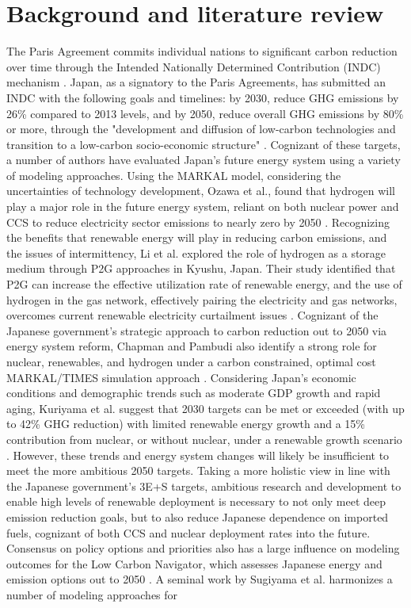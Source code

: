\section{Background and literature review} \label{litreview}
The Paris Agreement commits individual nations to significant carbon reduction over time through the Intended Nationally Determined Contribution (INDC) mechanism \cite{united_nations_framework_convention_on_climate_change_unfccc_submission_2015}. Japan, as a signatory to the Paris Agreements, has submitted an INDC with the following goals and timelines: by 2030, reduce GHG emissions by 26\% compared to 2013 levels, and by 2050, reduce overall GHG emissions by 80\% or more, through the "development and diffusion of low-carbon technologies and transition to a low-carbon socio-economic structure" \cite{united_nations_framework_convention_on_climate_change_unfccc_submission_2015}. Cognizant of these targets, a number of authors have evaluated Japan's future energy system using a variety of modeling approaches. Using the \gls{MARKAL} model, considering the uncertainties of technology development, Ozawa et al., found that hydrogen will play a major role in the future energy system, reliant on both nuclear power and \gls{CCS} to reduce electricity sector emissions to nearly zero by 2050 \cite{ozawa_hydrogen_2018}. Recognizing the benefits that renewable energy will play in reducing carbon emissions, and the issues of intermittency, Li et al. explored the role of hydrogen as a storage medium through \gls{P2G} approaches in Kyushu, Japan. Their study identified that \gls{P2G} can increase the effective utilization rate of renewable energy, and the use of hydrogen in the gas network, effectively pairing the electricity and gas networks, overcomes current renewable electricity curtailment issues \cite{li_potential_2019}. Cognizant of the Japanese government's strategic approach to carbon reduction out to 2050 via energy system reform, Chapman and Pambudi also identify a strong role for nuclear, renewables, and hydrogen under a carbon constrained, optimal cost MARKAL/TIMES simulation approach \cite{chapman_strategic_2018}. Considering Japan's economic conditions and demographic trends such as moderate GDP growth and rapid aging, Kuriyama et al. suggest that 2030 targets can be met or exceeded (with up to 42\% GHG reduction) with limited renewable energy growth and a 15\% contribution from nuclear, or without nuclear, under a renewable growth scenario \cite{kuriyama_can_2019}. However, these trends and energy system changes will likely be insufficient to meet the more ambitious 2050 targets. Taking a more holistic view in line with the Japanese government's 3E+S targets, ambitious research and development to enable high levels of renewable deployment is necessary to not only meet deep emission reduction goals, but to also reduce Japanese dependence on imported fuels, cognizant of both CCS and nuclear deployment rates into the future. Consensus on policy options and priorities also has a large influence on modeling outcomes for the Low Carbon Navigator, which assesses Japanese energy and emission options out to 2050 \cite{moinuddin_japan_2019}. A seminal work by Sugiyama et al. harmonizes a number of modeling approaches for 
